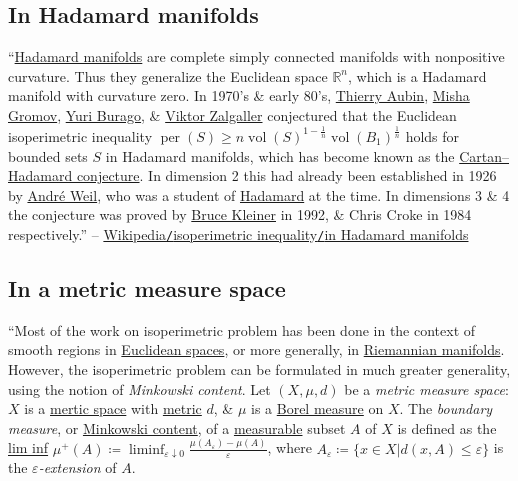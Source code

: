 \documentclass[oneside]{book}
\numberwithin{equation}{section}
\begin{document}
\subsection{In Hadamard manifolds}
``\href{https://en.wikipedia.org/wiki/Hadamard_manifold}{Hadamard manifolds} are complete simply connected manifolds with nonpositive curvature. Thus they generalize the Euclidean space $\mathbb{R}^n$, which is a Hadamard manifold with curvature zero. In 1970's \& early 80's, \href{https://en.wikipedia.org/wiki/Thierry_Aubin}{Thierry Aubin}, \href{https://en.wikipedia.org/wiki/Mikhail_Leonidovich_Gromov}{Misha Gromov}, \href{https://en.wikipedia.org/wiki/Yuri_Burago}{Yuri Burago}, \& \href{https://en.wikipedia.org/wiki/Viktor_Zalgaller}{Viktor Zalgaller} conjectured that the Euclidean isoperimetric inequality $\operatorname{per}(S)\ge n\operatorname{vol}(S)^{1 - \frac{1}{n}}\operatorname{vol}(B_1)^{\frac{1}{n}}$ holds for bounded sets $S$ in Hadamard manifolds, which has become known as the \href{https://en.wikipedia.org/wiki/Cartan%E2%80%93Hadamard_conjecture}{Cartan--Hadamard conjecture}. In dimension 2 this had already been established in 1926 by \href{https://en.wikipedia.org/wiki/Andr%C3%A9_Weil}{Andr\'e Weil}, who was a student of \href{https://en.wikipedia.org/wiki/Jacques_Hadamard}{Hadamard} at the time. In dimensions 3 \& 4 the conjecture was proved by \href{https://en.wikipedia.org/wiki/Bruce_Kleiner}{Bruce Kleiner} in 1992, \& Chris Croke in 1984 respectively.'' -- \href{https://en.wikipedia.org/wiki/Isoperimetric_inequality#In_Hadamard_manifolds}{Wikipedia\texttt{/}isoperimetric inequality\texttt{/}in Hadamard manifolds}

\subsection{In a metric measure space}
``Most of the work on isoperimetric problem has been done in the context of smooth regions in \href{https://en.wikipedia.org/wiki/Euclidean_space}{Euclidean spaces}, or more generally, in \href{https://en.wikipedia.org/wiki/Riemannian_manifold}{Riemannian manifolds}. However, the isoperimetric problem can be formulated in much greater generality, using the notion of \textit{Minkowski content}. Let $(X,\mu,d)$ be a \textit{metric measure space}: $X$ is a \href{https://en.wikipedia.org/wiki/Metric_space}{mertic space} with \href{https://en.wikipedia.org/wiki/Metric_(mathematics)}{metric} $d$, \& $\mu$ is a \href{https://en.wikipedia.org/wiki/Borel_measure}{Borel measure} on $X$. The \textit{boundary measure}, or \href{https://en.wikipedia.org/wiki/Minkowski_content}{Minkowski content}, of a \href{https://en.wikipedia.org/wiki/Measurable}{measurable} subset $A$ of $X$ is defined as the \href{https://en.wikipedia.org/wiki/Lim_inf}{lim inf} $\mu^+(A)\coloneqq\liminf_{\varepsilon\downarrow 0}\frac{\mu(A_\varepsilon) - \mu(A)}{\varepsilon}$, where $A_\varepsilon\coloneqq\{x\in X|d(x,A)\le\varepsilon\}$ is the \textit{$\varepsilon$-extension} of $A$.
\end{document}

